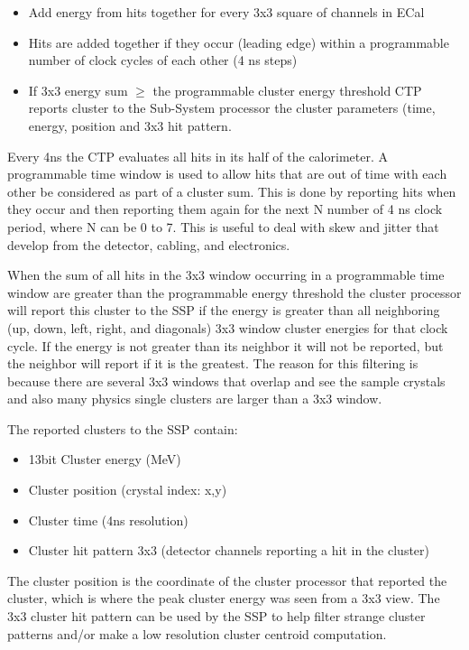 \begin{itemize}
\item Add energy from hits together for every 3x3 square of channels in ECal
\item Hits are added together if they occur (leading edge) within a programmable number of clock cycles of each other (4 ns steps)
\item If 3x3 energy sum $\ge$  the programmable cluster energy threshold CTP reports cluster to the Sub-System processor the cluster parameters (time, energy, position and 3x3 hit pattern. 
\end{itemize}

Every 4ns the CTP evaluates all hits in its half of the calorimeter. A programmable time window is used to allow hits that are out of time with each other be considered as part of a cluster sum. This is done by reporting hits when they occur and then reporting them again for the next N number of 4 ns clock period, where N can be 0 to 7. This is useful to deal with skew and jitter that develop from the detector, cabling, and electronics.

When the sum of all hits in the 3x3 window occurring in a programmable time window are greater than the programmable energy threshold the cluster processor will report this cluster to the SSP if the energy is greater than all neighboring (up, down, left, right, and diagonals) 3x3 window cluster energies for that clock cycle. If the energy is not greater than its neighbor it will not be reported, but the neighbor will report if it is the greatest. The reason for this filtering is because there are several 3x3 windows that overlap and see the sample crystals and also many physics single clusters are larger than a 3x3 window.

The reported clusters to the SSP contain:

\begin{itemize}
\item 13bit Cluster energy (MeV)
\item Cluster position (crystal index: x,y)
\item Cluster time (4ns resolution)
\item Cluster hit pattern 3x3 (detector channels reporting a hit in the cluster)
\end{itemize}

The cluster position is the coordinate of the cluster processor that reported the cluster, which is where the peak cluster energy was seen from a 3x3 view. The 3x3 cluster hit pattern can be used by the SSP to help filter strange cluster patterns and/or make a low resolution cluster centroid computation.

